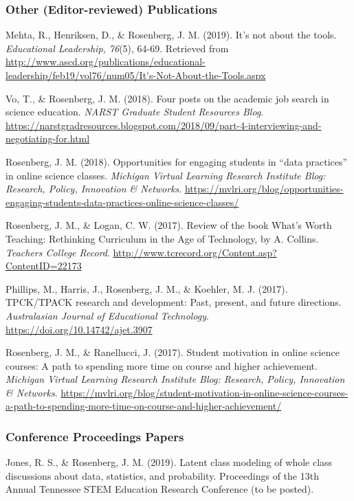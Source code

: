 \documentclass[]{article}
\begin{document}
\subsubsection{Other (Editor-reviewed)
Publications}\label{other-editor-reviewed-publications}

Mehta, R., Henriksen, D., \& Rosenberg, J. M. (2019). It's not about the
tools. \emph{Educational Leadership, 76}(5), 64-69. Retrieved from
\url{http://www.ascd.org/publications/educational-leadership/feb19/vol76/num05/It's-Not-About-the-Tools.aspx}

Vo, T., \& Rosenberg, J. M. (2018). Four posts on the academic job
search in science education. \emph{NARST Graduate Student Resources
Blog}.
\url{https://narstgradresources.blogspot.com/2018/09/part-4-interviewing-and-negotiating-for.html}

Rosenberg, J. M. (2018). Opportunities for engaging students in ``data
practices'' in online science classes. \emph{Michigan Virtual Learning
Research Institute Blog: Research, Policy, Innovation \& Networks}.
\url{https://mvlri.org/blog/opportunities-engaging-students-data-practices-online-science-classes/}

Rosenberg, J. M., \& Logan, C. W. (2017). Review of the book What's
Worth Teaching: Rethinking Curriculum in the Age of Technology, by A.
Collins. \emph{Teachers College Record}.
\url{http://www.tcrecord.org/Content.asp?ContentID=22173}

Phillips, M., Harris, J., Rosenberg, J. M., \& Koehler, M. J. (2017).
TPCK/TPACK research and development: Past, present, and future
directions. \emph{Australasian Journal of Educational Technology}.
\url{https://doi.org/10.14742/ajet.3907}

Rosenberg, J. M., \& Ranellucci, J. (2017). Student motivation in online
science courses: A path to spending more time on course and higher
achievement. \emph{Michigan Virtual Learning Research Institute Blog:
Research, Policy, Innovation \& Networks}.
\url{https://mvlri.org/blog/student-motivation-in-online-science-courses-a-path-to-spending-more-time-on-course-and-higher-achievement/}

\subsubsection{Conference Proceedings
Papers}\label{conference-proceedings-papers}

Jones, R. S., \& Rosenberg, J. M. (2019). Latent class modeling of whole
class discussions about data, statistics, and probability. Proceedings
of the 13th Annual Tennessee STEM Education Research Conference (to be
posted).
\end{document}

